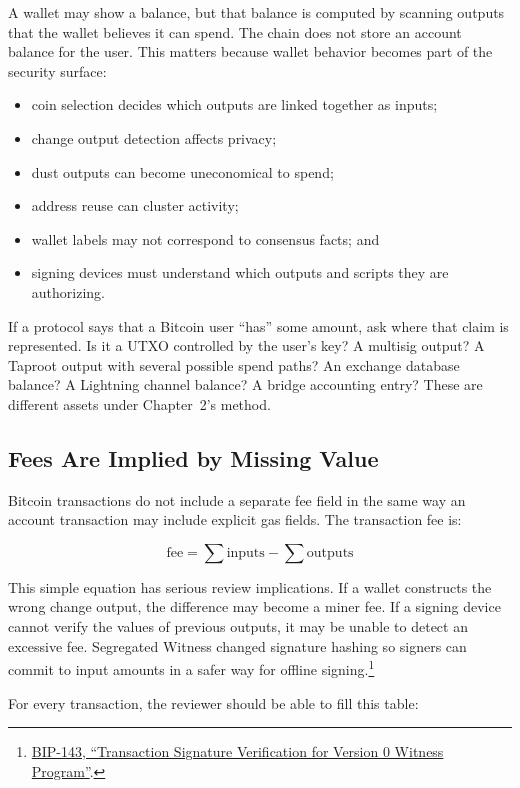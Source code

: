 A wallet may show a balance, but that balance is computed by scanning outputs that the wallet believes it can spend. The chain does not store an account balance for the user. This matters because wallet behavior becomes part of the security surface:

\begin{itemize}
\item coin selection decides which outputs are linked together as inputs;
\item change output detection affects privacy;
\item dust outputs can become uneconomical to spend;
\item address reuse can cluster activity;
\item wallet labels may not correspond to consensus facts; and
\item signing devices must understand which outputs and scripts they are authorizing.
\end{itemize}

If a protocol says that a Bitcoin user ``has'' some amount, ask where that claim is represented. Is it a UTXO controlled by the user's key? A multisig output? A Taproot output with several possible spend paths? An exchange database balance? A Lightning channel balance? A bridge accounting entry? These are different assets under Chapter~2's method.

\subsection{Fees Are Implied by Missing Value}

Bitcoin transactions do not include a separate fee field in the same way an account transaction may include explicit gas fields. The transaction fee is:

\[
\text{fee} = \sum \text{inputs} - \sum \text{outputs}
\]

This simple equation has serious review implications. If a wallet constructs the wrong change output, the difference may become a miner fee. If a signing device cannot verify the values of previous outputs, it may be unable to detect an excessive fee. Segregated Witness changed signature hashing so signers can commit to input amounts in a safer way for offline signing.\footnote{\href{https://github.com/bitcoin/bips/blob/master/bip-0143.mediawiki}{BIP-143, ``Transaction Signature Verification for Version 0 Witness Program''}.}

For every transaction, the reviewer should be able to fill this table:

